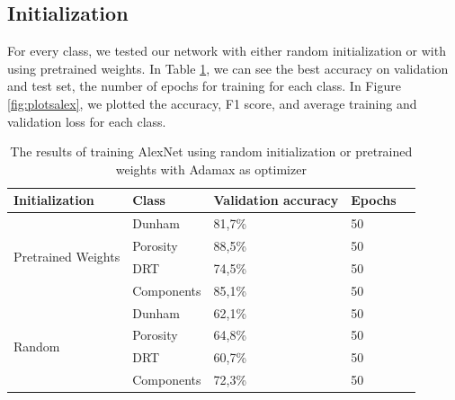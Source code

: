 \subsection{Initialization}
For every class, we tested our network with either random initialization or with using pretrained weights. In Table \ref{tab:alexinit}, we can see the best accuracy on validation and test set, the number of epochs for training for each class.  
In Figure \ref{fig:plotsalex}, we plotted the accuracy, F1 score, and average training and validation loss for each class. 
\begin{table}
\caption[Results according to initialization of AlexNet]{\label{tab:alexinit} The results of training AlexNet using random initialization or pretrained weights with Adamax as optimizer}
\centering
\begin{tabular}[b]{| l | l | l | l | l |}
\hline
    Initialization & Class & Validation accuracy  & Epochs\\ \hline
    \multirow{4}{*}{Pretrained Weights} & Dunham &  81,7\%  & 50 \\ %
    & Porosity & 88,5\% &  50 \\
    &DRT & 74,5\% &  50 \\
    &Components & 85,1\% &  50 \\ \hline
     \multirow{4}{*}{Random} & Dunham &  62,1\% & 50 \\
    & Porosity & 64,8\% &  50 \\
    &DRT & 60,7\% &  50 \\
    &Components & 72,3\% & 50 \\ \hline
\end{tabular} 
\end{table}

